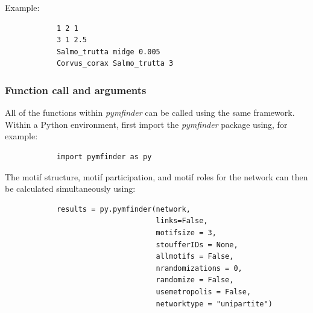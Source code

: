 \documentclass[12pt]{article}
\begin{document}
			Example:
			\begin{lstlisting}
			1 2 1
			3 1 2.5
			Salmo_trutta midge 0.005
			Corvus_corax Salmo_trutta 3
			\end{lstlisting}

		\subsubsection{Function call and arguments}
			All of the functions within \emph{pymfinder} can be called using the same framework. Within a Python environment, first import the \emph{pymfinder} package using, for example:

			\begin{lstlisting}
			import pymfinder as py
			\end{lstlisting}
			
			The motif structure, motif participation, and motif roles for the network can then be calculated simultaneously using:

			\begin{lstlisting}
			results = py.pymfinder(network,
			                       links=False,
			                       motifsize = 3,
			                       stoufferIDs = None,
			                       allmotifs = False,
			                       nrandomizations = 0,
			                       randomize = False,
			                       usemetropolis = False,
			                       networktype = "unipartite")
			\end{lstlisting}
\end{document}
